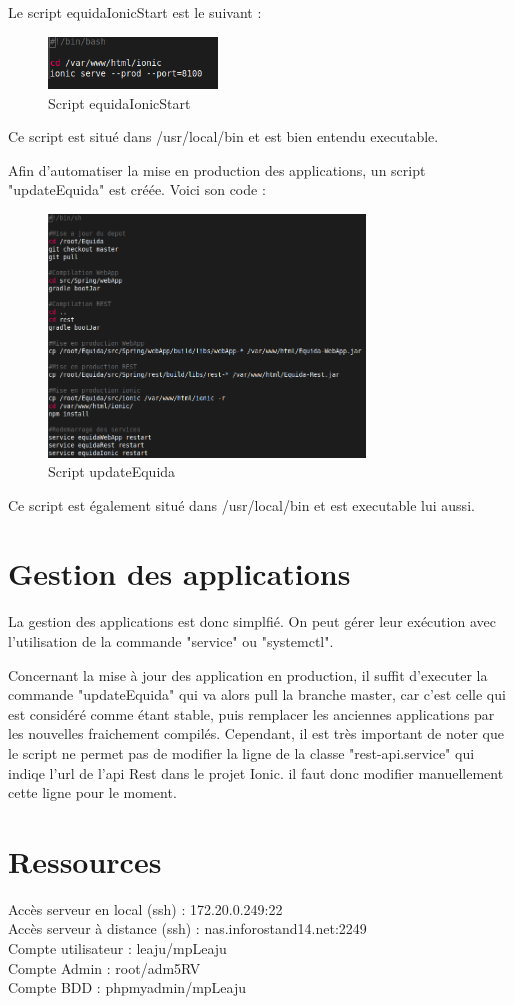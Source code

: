 \documentclass[report]{BetterDocument}
\begin{document}
		Le script equidaIonicStart est le suivant :

		\begin{figure}[H]
			\centering\includegraphics[width=0.4\textwidth, keepaspectratio]{res/script-equidaIonicStart.png}
			\caption{Script equidaIonicStart}
		\end{figure}

		Ce script est situé dans /usr/local/bin et est bien entendu executable.

		Afin d'automatiser la mise en production des applications, un script "updateEquida" est créée. Voici son code :

		\begin{figure}[H]
			\centering\includegraphics[width=0.75\textwidth, keepaspectratio]{res/script-updateEquida.png}
			\caption{Script updateEquida}
		\end{figure}

		Ce script est également situé dans /usr/local/bin et est executable lui aussi.

	\chapter{Gestion des applications}

		La gestion des applications est donc simplfié. On peut gérer leur exécution avec l'utilisation de la commande "service" ou "systemctl".

		Concernant la mise à jour des application en production, il suffit d'executer la commande "updateEquida" qui va alors pull la branche master, car c'est celle qui est considéré comme étant stable, puis remplacer les anciennes applications par les nouvelles fraichement compilés. Cependant, il est très important de noter que le script ne permet pas de modifier la ligne de la classe "rest-api.service" qui indiqe l'url de l'api Rest dans le projet Ionic. il faut donc modifier manuellement cette ligne pour le moment.

	\chapter{Ressources}
		\label{sec:ressources}
		\noindent
		Accès serveur en local (ssh) : 172.20.0.249:22\\
		Accès serveur à distance (ssh) : nas.inforostand14.net:2249\\
		Compte utilisateur : leaju/mpLeaju\\
		Compte Admin : root/adm5RV\\
		Compte BDD : phpmyadmin/mpLeaju
\end{document}
